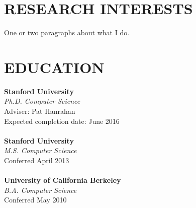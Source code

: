 \documentclass[line,margin]{res}
\begin{document}
\address{dritchie@stanford.edu | \url{stanford.edu/~dritchie}}
 
\begin{resume}

\section{RESEARCH INTERESTS}
One or two paragraphs about what I do.
 
\section{EDUCATION}
\textbf{Stanford University} \\
\emph{Ph.D. Computer Science} \\
Adviser: Pat Hanrahan \\
Expected completion date: June 2016 \\
\\
\textbf{Stanford University} \\
\emph{M.S. Computer Science} \\
Conferred April 2013 \\
\\
\textbf{University of California Berkeley} \\
\emph{B.A. Computer Science} \\
Conferred May 2010 \\



\end{resume}
\end{document}
